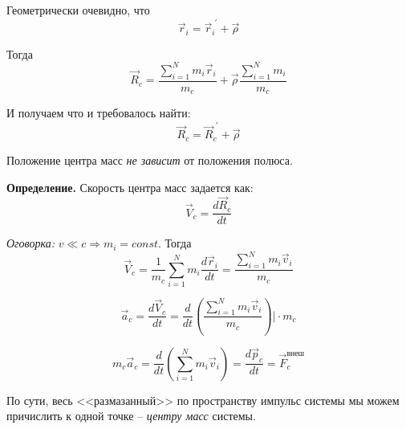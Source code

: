 \documentclass[a4paper,12pt]{extarticle}
\begin{document}
\begin{figure}[htbp]
	\centering
\end{figure}

Геометрически очевидно, что
\begin{equation}
	\vec{r}_i=\vec{r}^{\,\,'}_i+\vec{\rho}
\end{equation}

Тогда
\begin{equation}
	\vec{R}_c=\frac{\sum_{i=1}^N m_i\vec{r}_i}{m_c}+\vec\rho\frac{\sum_{i=1}^N m_i}{m_c}
\end{equation}
	
И получаем что и требовалось найти: 
\begin{equation}
	\vec{R}_c=\vec{R}_c^{\,\,'}+\vec{\rho}
\end{equation}

Положение центра масс \textit{не зависит} от положения полюса.


\textbf{Определение.} Скорость центра масс задается как:
\begin{equation}
	\vec{V}_c=\frac{d \vec{R}_c}{dt}
\end{equation}

\textit{Оговорка:} $v\ll c \Rightarrow m_i=const$. Тогда
\begin{equation}
	\vec{V}_c=\frac{1}{m_c}\sum_{i=1}^N m_i \frac{d\vec{r}_i}{dt}=
	\frac{\sum_{i=1}^N m_i\vec{v}_i}{m_c}
\end{equation}

\begin{equation}
	\vec{a}_c=\frac{d\vec{V}_c}{dt}=\frac{d}{dt}
	\left(\frac{\sum_{i=1}^N m_i\vec{v}_i}{m_c}\right) \bigg|\cdot m_c
\end{equation}

\begin{equation}
	m_c\vec{a}_c=\frac{d}{dt}
	\left(\sum_{i=1}^N m_i\vec{v}_i\right)=\frac{d\vec{p}_c}{dt}=\vec{F}_c^\text{внеш}
\end{equation}

По сути, весь <<размазанный>> по пространству импульс системы мы можем причислить к одной точке -- \textit{центру масс} системы.
\end{document}
